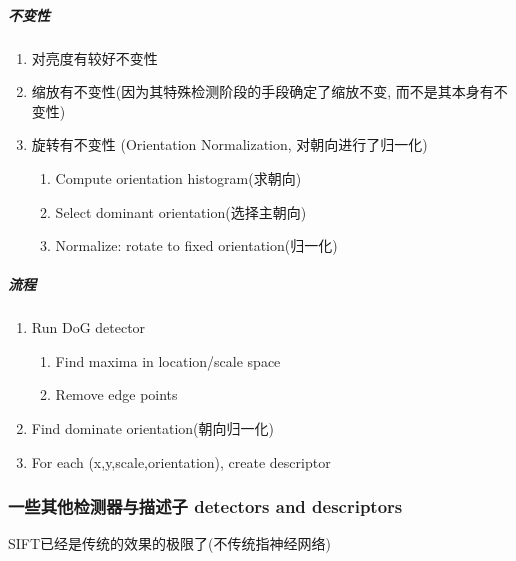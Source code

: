 \subparagraph{不变性}
\begin{enumerate}
    \item 对亮度有较好不变性
    \item 缩放有不变性(因为其特殊检测阶段的手段确定了缩放不变, 而不是其本身有不变性)
    \item 旋转有不变性 (Orientation Normalization, 对朝向进行了归一化)
    \begin{enumerate}
        \item Compute orientation histogram(求朝向)
        \item Select dominant orientation(选择主朝向)
        \item Normalize: rotate to fixed orientation(归一化)
    \end{enumerate}
\end{enumerate}

\subparagraph{流程}
\begin{enumerate}
    \item Run DoG detector
    \begin{enumerate}
        \item Find maxima in location/scale space
        \item Remove edge points
    \end{enumerate}
    \item Find dominate orientation(朝向归一化)
    \item For each (x,y,scale,orientation), create descriptor
\end{enumerate}
\subsubsection{一些其他检测器与描述子 detectors and descriptors}
SIFT已经是传统的效果的极限了(不传统指神经网络)

